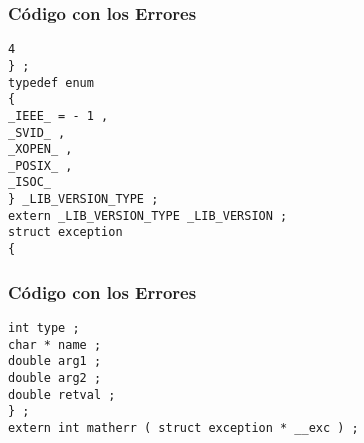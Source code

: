 \documentclass{beamer}
\begin{document}
\begin{frame}[fragile]
\frametitle{C\'odigo con los Errores}
\begin{verbatim}
4 
} ; 
typedef enum 
{ 
_IEEE_ = - 1 , 
_SVID_ , 
_XOPEN_ , 
_POSIX_ , 
_ISOC_ 
} _LIB_VERSION_TYPE ; 
extern _LIB_VERSION_TYPE _LIB_VERSION ; 
struct exception 
{ 
\end{verbatim}
\end{frame}
\begin{frame}[fragile]
\frametitle{C\'odigo con los Errores}
\begin{verbatim}
int type ; 
char * name ; 
double arg1 ; 
double arg2 ; 
double retval ; 
} ; 
extern int matherr ( struct exception * __exc ) ; \end{verbatim}
\end{frame}
\end{document}
